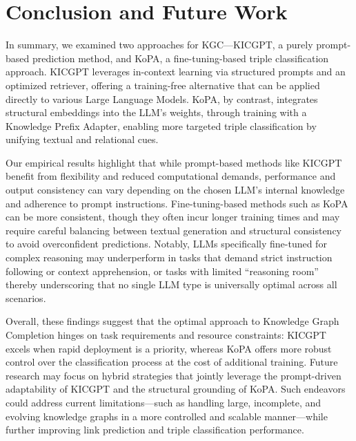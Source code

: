 \documentclass[12pt,a4paper]{article}
\begin{document}
%
%


\section{Conclusion and Future Work}\label{sec:conclusion-and-future-work}

In summary, we examined two approaches for KGC—KICGPT, a purely prompt-based prediction method, and KoPA, a fine-tuning-based triple classification approach.
KICGPT leverages in-context learning via structured prompts and an optimized retriever, offering a training-free alternative that can be applied directly to various Large Language Models.
KoPA, by contrast, integrates structural embeddings into the LLM's weights, through training with a Knowledge Prefix Adapter, enabling more targeted triple classification by unifying textual and relational cues.

Our empirical results highlight that while prompt-based methods like KICGPT benefit from flexibility and reduced computational demands, performance and output consistency can vary depending on the chosen LLM's internal knowledge and adherence to prompt instructions.
Fine-tuning-based methods such as KoPA can be more consistent, though they often incur longer training times and may require careful balancing between textual generation and structural consistency to avoid overconfident predictions.
Notably, LLMs specifically fine-tuned for complex reasoning may underperform in tasks that demand strict instruction following or context apprehension, or tasks with limited ``reasoning room'' thereby underscoring that no single LLM type is universally optimal across all scenarios.

Overall, these findings suggest that the optimal approach to Knowledge Graph Completion hinges on task requirements and resource constraints: KICGPT excels when rapid deployment is a priority, whereas KoPA offers more robust control over the classification process at the cost of additional training.
Future research may focus on hybrid strategies that jointly leverage the prompt-driven adaptability of KICGPT and the structural grounding of KoPA. Such endeavors could address current limitations—such as handling large, incomplete, and evolving knowledge graphs in a more controlled and scalable manner—while further improving link prediction and triple classification performance.

\end{document}
